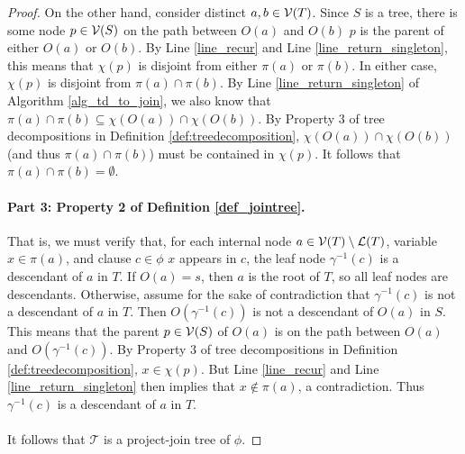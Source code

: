 \begin{proof}
    On the other hand, consider distinct $a, b \in \mathcal{V}(T)$. Since $S$ is a tree, there is some node $p \in \mathcal{V}(S)$ on the path between $O(a)$ and $O(b)$ \st{} $p$ is the parent of either $O(a)$ or $O(b)$. By Line \ref{line_recur} and Line \ref{line_return_singleton}, this means that $\chi(p)$ is disjoint from either $\pi(a)$ or $\pi(b)$. In either case, $\chi(p)$ is disjoint from $\pi(a) \cap \pi(b)$. By Line \ref{line_return_singleton} of Algorithm \ref{alg_td_to_join}, we also know that $\pi(a) \cap \pi(b) \subseteq \chi(O(a)) \cap \chi(O(b))$. By Property 3 of tree decompositions in Definition \ref{def:treedecomposition}, $\chi(O(a)) \cap \chi(O(b))$ (and thus $\pi(a) \cap \pi(b)$) must be contained in $\chi(p)$. It follows that $\pi(a) \cap \pi(b) = \emptyset$.

\paragraph{Part 3: Property 2 of Definition \ref{def_jointree}.}
    That is, we must verify that, for each internal node $a \in \mathcal{V}(T) \setminus \mathcal{L}(T)$, variable $x \in \pi(a)$, and clause $c \in \phi$ \st{} $x$ appears in $c$, the leaf node $\gamma^{-1}(c)$ is a descendant of $a$ in $T$.
    If $O(a) = s$, then $a$ is the root of $T$, so all leaf nodes are descendants.
    Otherwise, assume for the sake of contradiction that $\gamma^{-1}(c)$ is not a descendant of $a$ in $T$.
    Then $O(\gamma^{-1}(c))$ is not a descendant of $O(a)$ in $S$.
    This means that the parent $p \in \mathcal{V}(S)$ of $O(a)$ is on the path between $O(a)$ and $O(\gamma^{-1}(c))$. 
    By Property 3 of tree decompositions in Definition \ref{def:treedecomposition}, $x \in \chi(p)$.
    But Line \ref{line_recur} and Line \ref{line_return_singleton} then implies that $x \not\in \pi(a)$, a contradiction.
    Thus $\gamma^{-1}(c)$ is a descendant of $a$ in $T$.
    
\paragraph{} It follows that $\mathcal{T}$ is a project-join tree of $\phi$.
\end{proof}

